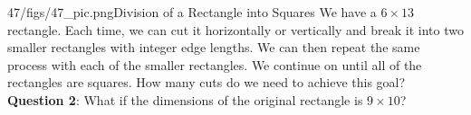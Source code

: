 \begin{problem}{47/figs/47_pic.png}{Division of a Rectangle into Squares} We have a $6 \times 13$ rectangle. Each time, we can cut it horizontally or vertically and break it into two smaller rectangles with integer edge lengths. We can then repeat the same process with each of the smaller rectangles. We continue on until all of the rectangles are squares. How many cuts do we need to achieve this goal?\\[0.2cm]
	
\textbf{Question 2}: What if the dimensions of the original rectangle is $9 \times 10$?\end{problem}